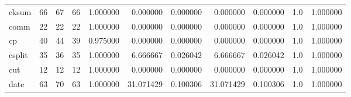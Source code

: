 \begin{longtable}{lrrrrrrrrrr}
cksum     &                                      66 &                 67 &                                66 &                                   1.000000 &                               0.000000 &                                     0.000000 &                          0.000000 &                                0.000000 &                                1.0 &                                           1.000000 \\
comm      &                                      22 &                 22 &                                22 &                                   1.000000 &                               0.000000 &                                     0.000000 &                          0.000000 &                                0.000000 &                                1.0 &                                           1.000000 \\
cp        &                                      40 &                 44 &                                39 &                                   0.975000 &                               0.000000 &                                     0.000000 &                          0.000000 &                                0.000000 &                                1.0 &                                           1.000000 \\
csplit    &                                      35 &                 36 &                                35 &                                   1.000000 &                               6.666667 &                                     0.026042 &                          6.666667 &                                0.026042 &                                1.0 &                                           1.000000 \\
cut       &                                      12 &                 12 &                                12 &                                   1.000000 &                               0.000000 &                                     0.000000 &                          0.000000 &                                0.000000 &                                1.0 &                                           1.000000 \\
date      &                                      63 &                 70 &                                63 &                                   1.000000 &                              31.071429 &                                     0.100306 &                         31.071429 &                                0.100306 &                                1.0 &                                           1.000000 \\

\end{longtable}
